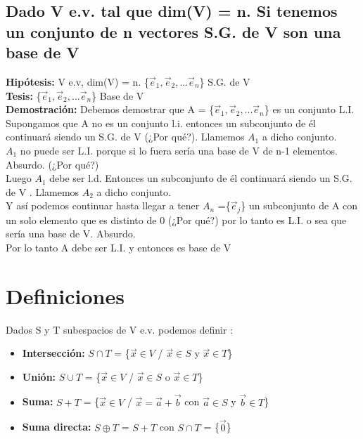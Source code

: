 \documentclass[11pt]{article}
\begin{document}
\subsection{Dado V e.v. tal que dim(V) = n. Si tenemos un conjunto de n vectores S.G. de V son una base de V}
{\bfseries {Hipótesis:}} V e.v, dim(V) = n. \{$\vec{e}_{1}, \vec{e}_2,... \vec{e}_n $\} S.G. de V \\
{\bfseries {Tesis:}} \{$\vec{e}_{1}, \vec{e}_2,... \vec{e}_n $\} Base de V\\
{\bfseries Demostración:} Debemos demostrar que A = \{$\vec{e}_{1}, \vec{e}_2,... \vec{e}_n $\} es un conjunto L.I. \\
Supongamos que A no es un conjunto l.i. entonces un subconjunto de él continuará siendo un S.G. de V (¿Por qué?). Llamemos $A_1$ a dicho conjunto.\\
$A_1$ no puede ser L.I. porque si lo fuera sería una base de V
de n-1 elementos. Absurdo. (¿Por qué?)\\
Luego $A_1$ debe ser l.d. Entonces un subconjunto de él continuará siendo un S.G. de V . Llamemos $A_2$ a dicho conjunto.\\
Y así podemos continuar hasta llegar a tener $A_n$ =\{$\vec{e}_j$\} un subconjunto de A con un solo elemento que es distinto de 0 (¿Por qué?) por lo
tanto es L.I. o sea que sería una base de V. Absurdo. \\
Por lo tanto A debe ser L.I. y entonces es base de V 
\section{Definiciones}
Dados S y T subespacios de V e.v. podemos definir :
\begin{itemize}
\item {\bfseries {Intersección:}} $S \cap T$ = \{$\vec{x} \in V$ / $\vec{x} \in S$ y $\vec{x} \in T$\}
\item {\bfseries {Unión:}} $S \cup T$ = \{$\vec{x} \in V$ / $\vec{x} \in S$ o $\vec{x} \in T$\}
\item {\bfseries {Suma:}} $S + T$ = \{$\vec{x} \in V$ / $\vec{x} = \vec{a} + \vec{b}$ con $\vec{a} \in S$ y $\vec{b} \in T$\}
\item {\bfseries {Suma directa:}} $S \oplus T$ = $S+T$ con $S \cap T$ = \{$\vec{0}$\}
\end{itemize}
\end{document}
